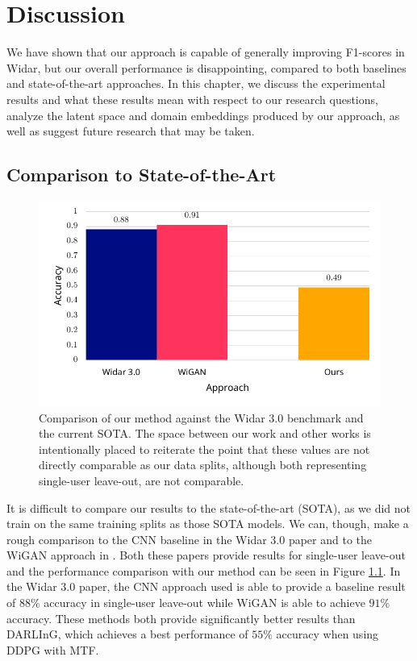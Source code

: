 \chapter{Discussion}

We have shown that our approach is capable of generally improving F1-scores in Widar, but our overall performance is disappointing, compared to both baselines and state-of-the-art approaches.
In this chapter, we discuss the experimental results and what these results mean with respect to our research questions, analyze the latent space and domain embeddings produced by our approach, as well as suggest future research that may be taken.

\section{Comparison to State-of-the-Art}

\begin{figure}
	\centering
	\includegraphics[width=5in]{figures/results_sota}
	\caption{Comparison of our method against the Widar 3.0 benchmark and the current SOTA. The space between our work and other works is intentionally placed to reiterate the point that these values are not directly comparable as our data splits, although both representing single-user leave-out, are not comparable.}
	\label{fig:results-sota}
\end{figure}

It is difficult to compare our results to the state-of-the-art (SOTA), as we did not train on the same training splits as those SOTA models.
We can, though, make a rough comparison to the CNN baseline in the Widar 3.0 paper \cite{zheng2019zero} and to the WiGAN approach in \cite{jiang2020wigan}.
Both these papers provide results for single-user leave-out and the performance comparison with our method can be seen in Figure \ref{fig:results-sota}.
In the Widar 3.0 paper, the CNN approach used is able to provide a baseline result of $88\%$ accuracy in single-user leave-out while 
WiGAN is able to achieve $91\%$ accuracy.
These methods both provide significantly better results than DARLInG, which achieves a best performance of $55\%$ accuracy when using DDPG with MTF.

